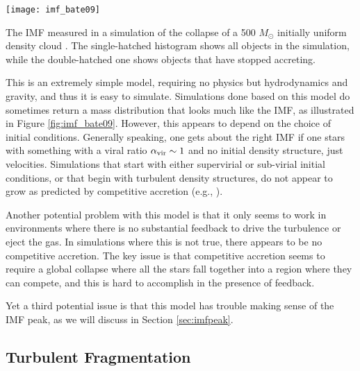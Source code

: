 \begin{marginfigure}
\texttt{[image: imf\_bate09]}
\caption[IMF in a competitive accretion simulation]{
\label{fig:imf_bate09}
The IMF measured in a simulation of the collapse of a 500 $M_\odot$ initially uniform density cloud \citep{bate09b}. The single-hatched histogram shows all objects in the simulation, while the double-hatched one shows objects that have stopped accreting.
}
\end{marginfigure}
This is an extremely simple model, requiring no physics but hydrodynamics and gravity, and thus it is easy to simulate. Simulations done based on this model do sometimes return a mass distribution that looks much like the IMF, as illustrated in Figure \ref{fig:imf_bate09}. However, this appears to depend on the choice of initial conditions. Generally speaking, one gets about the right IMF if one stars with something with a viral ratio $\alpha_{\rm vir} \sim 1$ and no initial density structure, just velocities. Simulations that start with either supervirial or sub-virial initial conditions, or that begin with turbulent density structures, do not appear to grow as predicted by competitive accretion (e.g., \citealt{clark08a}).

Another potential problem with this model is that it only seems to work in environments where there is no substantial feedback to drive the turbulence or eject the gas. In simulations where this is not true, there appears to be no competitive accretion. The key issue is that competitive accretion seems to require a global collapse where all the stars fall together into a region where they can compete, and this is hard to accomplish in the presence of feedback.

Yet a third potential issue is that this model has trouble making sense of the IMF peak, as we will discuss in Section \ref{sec:imfpeak}.

\subsection{Turbulent Fragmentation}

